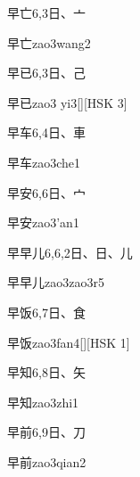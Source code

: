\begin{entry}{早亡}{6,3}{⽇、⼇}
  \begin{phonetics}{早亡}{zao3wang2}
  \end{phonetics}
\end{entry}

\begin{entry}{早已}{6,3}{⽇、⼰}
  \begin{phonetics}{早已}{zao3 yi3}[][HSK 3]
  \end{phonetics}
\end{entry}

\begin{entry}{早车}{6,4}{⽇、⾞}
  \begin{phonetics}{早车}{zao3che1}
  \end{phonetics}
\end{entry}

\begin{entry}{早安}{6,6}{⽇、⼧}
  \begin{phonetics}{早安}{zao3'an1}
  \end{phonetics}
\end{entry}

\begin{entry}{早早儿}{6,6,2}{⽇、⽇、⼉}
  \begin{phonetics}{早早儿}{zao3zao3r5}
  \end{phonetics}
\end{entry}

\begin{entry}{早饭}{6,7}{⽇、⾷}
  \begin{phonetics}{早饭}{zao3fan4}[][HSK 1]
  \end{phonetics}
\end{entry}

\begin{entry}{早知}{6,8}{⽇、⽮}
  \begin{phonetics}{早知}{zao3zhi1}
  \end{phonetics}
\end{entry}

\begin{entry}{早前}{6,9}{⽇、⼑}
  \begin{phonetics}{早前}{zao3qian2}
  \end{phonetics}
\end{entry}

